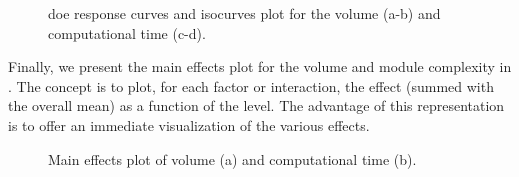 \begin{figure}
    \hfill
    \hspace*{\fill}
    \caption{\acrfull{doe} response curves and isocurves plot for the volume (a-b) and computational time (c-d).}
    \label{fig:05_doe}
\end{figure}

Finally, we present the main effects plot for the volume and module complexity in . The concept is to plot, for each factor or interaction, the effect (summed with the overall mean) as a function of the level. The advantage of this representation is to offer an immediate visualization of the various effects.
\begin{figure}
    \centering
    \bigskip
    \caption{Main effects plot of volume (a) and computational time (b).}
    \label{fig:05_doe_main_eff}
\end{figure}
